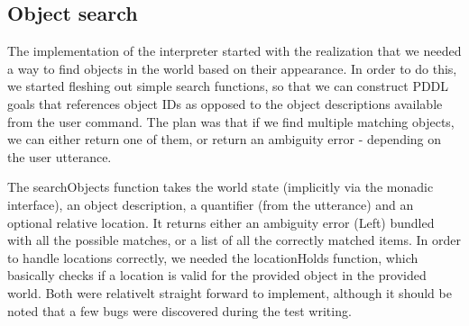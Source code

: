 \subsection*{Object search}
The implementation of the interpreter started with the realization that we needed a way to find objects in the world based on their appearance. In order to do this, we started fleshing out simple search functions, so that we can construct PDDL goals that references object IDs as opposed to the object descriptions available from the user command. The plan was that if we find multiple matching objects, we can either return one of them, or return an ambiguity error - depending on the user utterance.

The searchObjects function takes the world state (implicitly via the monadic interface), an object description, a quantifier (from the utterance) and an optional relative location. It returns either an ambiguity error (Left) bundled with all the possible matches, or a list of all the correctly matched items. In order to handle locations correctly, we needed the locationHolds function, which basically checks if a location is valid for the provided object in the provided world. Both were relativelt straight forward to implement, although it should be noted that a few bugs were discovered during the test writing.

